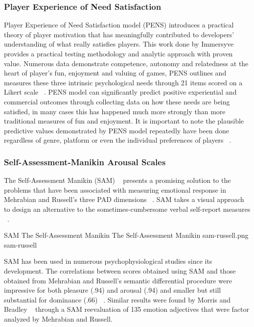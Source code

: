 \subsubsection{Player Experience of Need Satisfaction}
Player Experience of Need Satisfaction model (PENS) introduces a practical theory of player motivation that has meaningfully contributed to developers' understanding of what really satisfies players. This work done by Immersyve ~\cite{rigby2007pens} provides a practical testing methodology and analytic approach with proven value. Numerous data demonstrate competence, autonomy and relatedness at the heart of player's fun, enjoyment and valuing of games, PENS outlines and measures these three intrinsic psychological needs through 21 items scored on a Likert scale ~\cite{rigby2007pens}. PENS model can significantly predict positive experiential and commercial outcomes through collecting data on how these needs are being satisfied, in many cases this has happened much more strongly than more traditional measures of fun and enjoyment. It is important to note the plausible predictive values demonstrated by PENS model repeatedly have been done regardless of genre, platform or even the individual preferences of players ~\cite{rigby2007pens}.

\subsubsection{Self-Assessment-Manikin Arousal Scales}
The Self-Assessment Manikin (SAM) ~\cite{lang1985cognitive} presents a promising solution to the problems that have been associated with measuring emotional response in Mehrabian and Russell's three PAD dimensions ~\cite{russell1977evidence}. SAM takes a visual approach to design an alternative to the sometimes-cumbersome verbal self-report measures ~\cite{lang1985cognitive}.

\img
{SAM The Self-Assessment Manikin}
{The Self-Assessment Manikin}
{sam-russell.png}
{sam-russell}

SAM has been used in numerous psychophysiological studies since its development. The correlations between scores obtained using SAM and those obtained from Mehrabian and Russell's semantic differential procedure were impressive for both pleasure (.94) and arousal (.94) and smaller but still substantial for dominance (.66) ~\cite{lang1985cognitive}. Similar results were found by Morris and Bradley ~\cite{morris1995observations} through a SAM reevaluation of 135 emotion adjectives that were factor analyzed by Mehrabian and Russell.

